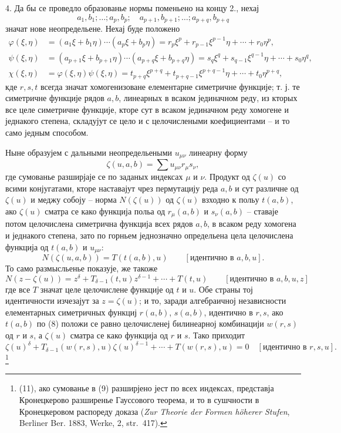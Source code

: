 ﻿\documentclass[11pt]{article}
\begin{document}
4. Да бы се проведло образованье нормы поменьено на концу 2., нехај
\[
 a_1,b_1;\ldots; a_p,b_p;\quad a_{p+1},b_{p+1};\ldots; a_{p+q},b_{p+q}
\]
значат нове неопредельене. Нехај буде положено
\begin{equation}
\begin{aligned}
 \varphi(\xi,\eta)&=(a_1\xi+b_1\eta)\cdots(a_p\xi+b_p\eta)
     =r_p\xi^p+r_{p-1}\xi^{p-1}\eta+\cdots+r_0\eta^p,\\
 \psi(\xi,\eta)&=(a_{p+1}\xi+b_{p+1}\eta)\cdots(a_{p+q}\xi+b_{p+q}\eta)
     =s_q\xi^q+s_{q-1}\xi^{q-1}\eta+\cdots+s_0\eta^q,\\
 \chi(\xi,\eta)&=\varphi(\xi,\eta)\psi(\xi,\eta)
     =t_{p+q}\xi^{p+q}+t_{p+q-1}\xi^{p+q-1}\eta+\cdots+t_0\eta^{p+q},
\end{aligned}
\tag{8}
\end{equation}
кде $r,s,t$ всегда значат хомогенизоване елементарне симетричне функције; т. ј. те симетричне функције рядов $a,b$, линеарных в всаком јединачном реду, из кторых все целе симетричне функције, кторе сут в всаком јединачном реду хомогене и једнакого степена, складујут се цело и с целочислеными коефициентами -- и то само једным способом.

Ныне образујем с дальными неопредельеными $u_{\mu\nu}$ линеарну форму
\begin{equation}
 \zeta(u,a,b)=\sum u_{\mu\nu}r_\mu s_\nu,
\tag{9}
\end{equation}
где сумованье разширјаје се по заданых индексах $\mu$ и $\nu$. Продукт од $\zeta(u)$ со всими конјугатами, кторе наставајут чрез пермутацију реда $a,b$ и сут различне од $\zeta(u)$ и меджу собоју -- норма $N(\zeta(u))$ од $\zeta(u)$ взходно к польу $t(a,b)$, ако $\zeta(u)$ сматра се како функција польа од $r_\mu(a,b)$ и $s_\nu(a,b)$ -- ставаје потом целочислена симетрична функција всех рядов $a,b$, в всаком реду хомогена и једнакого степена, зато по горньем једнозначно определьена цела целочислена функција од $t(a,b)$ и $u_{\mu\nu}$:
\begin{equation}
 N(\zeta(u,a,b))=T(t(a,b),u)\qquad[\text{идентично в }a,b,u].
\tag{10}
\end{equation}
То само размысльенье показује, же такоже
\[
N(z-\zeta(u))=z^\delta+T_{\delta-1}(t,u)z^{\delta-1}+\cdots+T(t,u)
\qquad[\text{идентично в }a,b,u,z]
\]
где все $T$ значат целе целочислене функције од $t$ и $u$. Обе страны тој идентичности изчезајут за $z=\zeta(u)$; и то, заради алгебраичној независности елементарных симетричных функциј $r(a,b)$, $s(a,b)$, идентично в $r,s$, ако $t(a,b)$ по (8) положи се равно целочисленеј билинеарној комбинацији $w(r,s)$ од $r$ и $s$, а $\zeta(u)$ сматра се како функција од $r$ и $s$. Тако приходит
\begin{equation}
\zeta(u)^\delta+T_{\delta-1}(w(r,s),u)\zeta(u)^{\delta-1}+\cdots+T(w(r,s),u)=0
\quad[\text{идентично в }r,s,u].
\tag{11}
\end{equation}\footnote{(11), ако сумованье в (9) разширјено јест по всех индексах, представја Кронецкерово разширенье Гауссового теорема, и то в сушчности в Кронецкеровом распореду доказа (\emph{Zur Theorie der Formen höherer Stufen}, Berliner Ber. 1883, Werke, 2, str.~417).}
\end{document}
